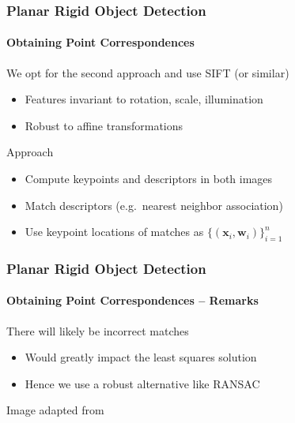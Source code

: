 \documentclass[xetex,professionalfont]{beamer}
\renewcommand{\vec}[1]{\ensuremath{\mathbf{#1}}}
\newcommand{\vw}{\vec{w}}
\newcommand{\vx}{\vec{x}}
\begin{document}
\begin{frame}
\frametitle{Planar Rigid Object Detection}
\framesubtitle{Obtaining Point Correspondences}

We opt for the second approach and use SIFT (or similar)
\begin{itemize}
    \item Features invariant to rotation, scale, illumination %
    \item Robust to affine transformations %
\end{itemize}

\bigskip
Approach
\begin{itemize}
    \item Compute keypoints and descriptors in both images
    \item Match descriptors (e.g.\ nearest neighbor association)
    \item Use keypoint locations of matches as $\{(\vx_i,\vw_i)\}_{i=1}^n$
\end{itemize}

\end{frame}


\begin{frame}
\frametitle{Planar Rigid Object Detection}
\framesubtitle{Obtaining Point Correspondences -- Remarks}

There will likely be incorrect matches
\begin{itemize}
    \item Would greatly impact the least squares solution
    \item Hence we use a robust alternative like RANSAC
\end{itemize}

\bigskip
\begin{center}
    {\centering Image adapted from \cite{prince12}}
\end{center}

\end{frame}
\end{document}
